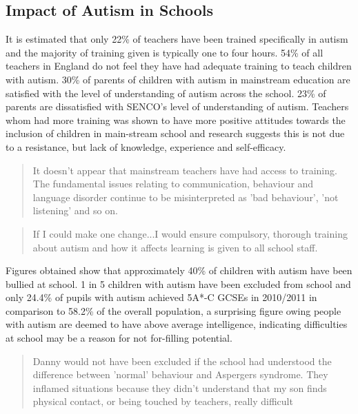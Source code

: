 \documentclass[11pt]{report}
\begin{document}
\subsection{Impact of Autism in Schools}
It is estimated that only 22\% of teachers have been trained specifically in autism and the majority of training given is typically one to four hours\cite{nasschool}. 54\% of all teachers in England do not feel they have had adequate training to teach children with autism.\cite{statsandfacts} 30\% of parents of children with autism in mainstream education are satisfied with the level of understanding of autism across the school\cite{nasschool}. 23\% of parents are dissatisfied with SENCO's level of understanding of autism. Teachers whom had more training was shown to have more positive attitudes towards the inclusion of children in main-stream school and research suggests this is not due to a resistance, but lack of knowledge, experience and self-efficacy\cite{teachersinclusion}.

\begin{quote}
It doesn't appear that mainstream teachers have had access to training. The fundamental issues relating to communication, behaviour and language disorder continue to be misinterpreted as 'bad behaviour', 'not listening' and so on.\cite{nasschool}
\end{quote}

\begin{quote}
If I could make one change...I would ensure compulsory, thorough training about autism and how it affects learning is given to all school staff. \cite{nasschool}
\end{quote}

Figures obtained show that approximately 40\% of children with autism have been bullied at school. 1 in 5 children with autism have been excluded from school \cite{nasschool} and only 24.4\% of pupils with autism achieved 5A*-C GCSEs in 2010/2011 in comparison to 58.2\% of the overall population\cite{statsandfacts}, a surprising figure owing people with autism are deemed to have above average intelligence, indicating difficulties at school may be a reason for not for-filling potential. 

\begin{quote}
Danny would not have been excluded if the school had understood the difference between 'normal' behaviour and Aspergers syndrome. They inflamed situations because they didn't understand that my son finds physical contact, or being touched by teachers, really difficult \cite{nasschool}
\end{quote}
\end{document}
